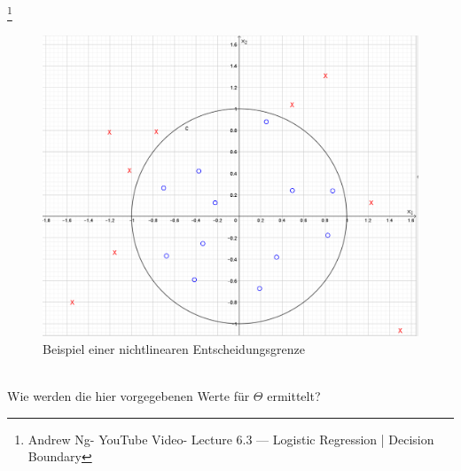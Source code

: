 \documentclass[a4paper]{scrreprt}
\begin{document}
\footnote{Andrew Ng- YouTube Video- Lecture 6.3 — Logistic Regression | Decision Boundary}
\\
%
\begin{figure}[h]
\centering
\includegraphics[scale=.74]{Abbildungen/Logistische_Regression_3}
\caption{Beispiel einer nichtlinearen Entscheidungsgrenze}
\label{figure}
\end{figure}
\\
Wie werden die hier vorgegebenen Werte für $\Theta$ ermittelt?\newpage
\end{document}

